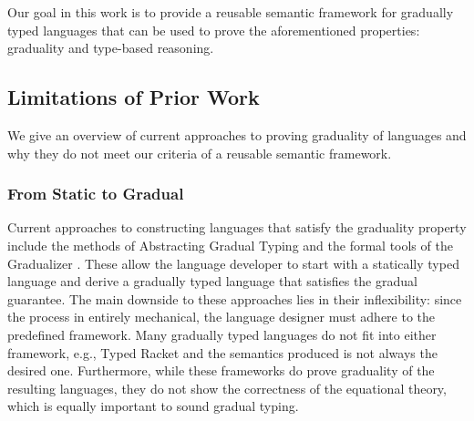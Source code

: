 Our goal in this work is to provide a reusable semantic framework for
gradually typed languages that can be used to prove the aforementioned
properties: graduality and type-based reasoning. 

\subsection{Limitations of Prior Work}

We give an overview of current approaches to proving graduality of
languages and why they do not meet our criteria of a reusable semantic
framework.

\subsubsection{From Static to Gradual}

Current approaches to constructing languages that satisfy the
graduality property include the methods of Abstracting Gradual Typing
\cite{garcia-clark-tanter2016} and the formal tools of the Gradualizer
\cite{cimini-siek2016}.  These allow the language developer to start
with a statically typed language and derive a gradually typed language
that satisfies the gradual guarantee. The main downside to these
approaches lies in their inflexibility: since the process in entirely
mechanical, the language designer must adhere to the predefined
framework.  Many gradually typed languages do not fit into either
framework, e.g., Typed Racket \cite{tobin-hochstadt06,
  tobin-hochstadt08} and the semantics produced is not always the
desired one.
%
Furthermore, while these frameworks do prove graduality of the
resulting languages, they do not show the correctness of the
equational theory, which is equally important to sound gradual typing.



